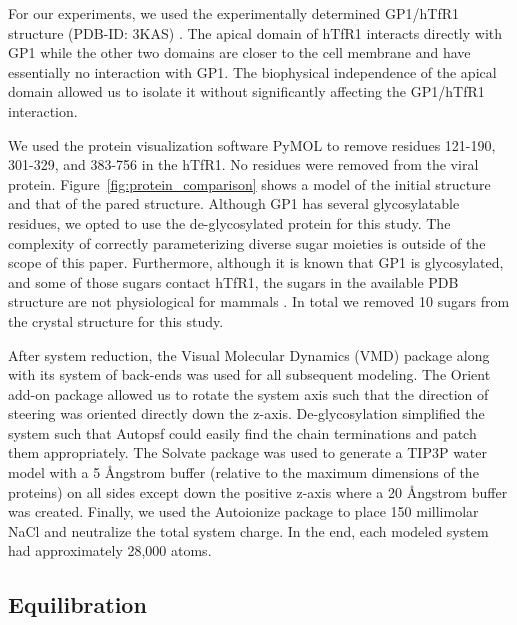 \documentclass[12pt]{article}
\begin{document}
For our experiments, we used the experimentally determined GP1/hTfR1 structure (PDB-ID: 3KAS) \citep{Abraham2010}. The apical domain of hTfR1 interacts directly with GP1 while the other two domains are closer to the cell membrane and have essentially no interaction with GP1. The biophysical independence of the apical domain allowed us to isolate it without significantly affecting the GP1/hTfR1 interaction. 

We used the protein visualization software PyMOL \citep{PyMOL} to remove residues 121-190, 301-329, and 383-756 in the hTfR1. No residues were removed from the viral protein.  Figure~\ref{fig:protein_comparison} shows a model of the initial structure and that of the pared structure. Although GP1 has several glycosylatable residues, we opted to use the de-glycosylated protein for this study. The complexity of correctly parameterizing diverse sugar moieties is outside of the scope of this paper. Furthermore, although it is known that GP1 is glycosylated, and some of those sugars contact hTfR1, the sugars in the available PDB structure are not physiological for mammals \citep{Abraham2010}.  In total we removed 10 sugars from the crystal structure for this study.

After system reduction, the Visual Molecular Dynamics (VMD) \citep{Humphrey1996} package along with its system of back-ends was used for all subsequent modeling. The Orient add-on package allowed us to rotate the system axis such that the direction of steering was oriented directly down the z-axis. De-glycosylation simplified the system such that Autopsf could easily find the chain terminations and patch them appropriately. The Solvate package was used to generate a TIP3P water model with a 5 \AA ngstrom buffer (relative to the maximum dimensions of the proteins) on all sides except down the positive z-axis where a 20 \AA ngstrom buffer was created. Finally, we used the Autoionize package to place 150 millimolar NaCl and neutralize the total system charge. In the end, each modeled system had approximately 28,000 atoms.

\subsection{Equilibration}
\end{document}

